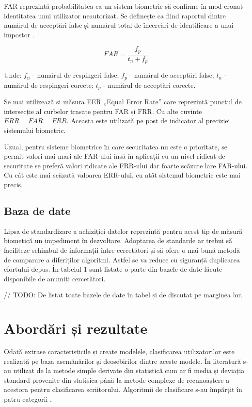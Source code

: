 \documentclass[9pt,shortpaper,twoside,web]{ieeecolor}
\begin{document}
FAR reprezintă probabilitatea ca un sistem biometric să confirme în mod eronat identitatea unui utilizator neautorizat. Se definește ca fiind raportul dintre numărul de acceptări false și numărul total de încercări de identificare a unui impostor \cite{b7}.

\begin{equation} \label{eq1}
FAR = \frac{f_p}{t_n + f_p}
\end{equation}

Unde: $f_n$ - numărul de respingeri false; $f_p$ - numărul de acceptări false; $t_n$ - numărul de respingeri corecte; $t_p$ - numărul de acceptări corecte.

	Se mai utilizează și măsura EER „Equal Error Rate” care reprezintă punctul de intersecție al curbelor trasate pentru FAR și FRR. Cu alte cuvinte $ERR = FAR = FRR$. Aceasta este utilizată pe post de indicator al preciziei sistemului biometric.
	
	Uzual, pentru sisteme biometrice în care securitatea nu este o prioritate, se permit valori mai mari ale FAR-ului însă în aplicații cu un nivel ridicat de securitate se preferă valori ridicate ale FRR-ului dar foarte scăzute lare FAR-ului. Cu cât este mai scăzută valoarea ERR-ului, cu atât sistemul biometric este mai precis.

\subsection{Baza de date}
	Lipsa de standardizare a achiziției datelor reprezintă pentru acest tip de măsură biometică un impediment în dezvoltare. Adoptarea de standarde ar trebui să faciliteze schimbul de informații între cercetători  și să ofere o mai bună metodă de comparare a diferiților algoritmi. Astfel se va reduce cu siguranță duplicarea efortului depus.
	În tabelul 1 sunt listate o parte din bazele de date făcute disponibile de anumiți cercetători. 
	
// TODO: De listat toate bazele de date în tabel și de discutat pe marginea lor.

\section{Abordări și rezultate}
	Odată extrase caracteristicile și create modelele, clasificarea utilizatorilor este realizată pe baza asemănărilor și deosebirilor dintre aceste modele. În literatură s-au utilizat de la metode simple derivate din statistică cum ar fi media și deviația standard provenite din statisica până la metode complexe de recunoaștere a acestora pentru clasificarea scriitorului. Algoritmii de clasificare s-au împărțit în patru categorii \cite{b7}.
\end{document}
